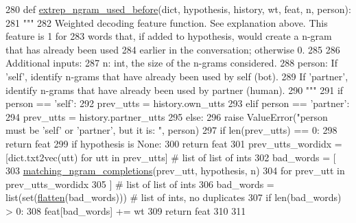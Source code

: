 \begin{DoxyCode}
280 \textcolor{keyword}{def }\hyperlink{namespaceprojects_1_1controllable__dialogue_1_1controllable__seq2seq_1_1controls_a5bc41cc6c701b5da46a74b17ead0e834}{extrep\_ngram\_used\_before}(dict, hypothesis, history, wt, feat, n, person):
281     \textcolor{stringliteral}{"""}
282 \textcolor{stringliteral}{    Weighted decoding feature function. See explanation above. This feature is 1 for}
283 \textcolor{stringliteral}{    words that, if added to hypothesis, would create a n-gram that has already been used}
284 \textcolor{stringliteral}{    earlier in the conversation; otherwise 0.}
285 \textcolor{stringliteral}{}
286 \textcolor{stringliteral}{    Additional inputs:}
287 \textcolor{stringliteral}{      n: int, the size of the n-grams considered.}
288 \textcolor{stringliteral}{      person: If 'self', identify n-grams that have already been used by self (bot).}
289 \textcolor{stringliteral}{        If 'partner', identify n-grams that have already been used by partner (human).}
290 \textcolor{stringliteral}{    """}
291     \textcolor{keywordflow}{if} person == \textcolor{stringliteral}{'self'}:
292         prev\_utts = history.own\_utts
293     \textcolor{keywordflow}{elif} person == \textcolor{stringliteral}{'partner'}:
294         prev\_utts = history.partner\_utts
295     \textcolor{keywordflow}{else}:
296         \textcolor{keywordflow}{raise} ValueError(\textcolor{stringliteral}{"person must be 'self' or 'partner', but it is: "}, person)
297     \textcolor{keywordflow}{if} len(prev\_utts) == 0:
298         \textcolor{keywordflow}{return} feat
299     \textcolor{keywordflow}{if} hypothesis \textcolor{keywordflow}{is} \textcolor{keywordtype}{None}:
300         \textcolor{keywordflow}{return} feat
301     prev\_utts\_wordidx = [dict.txt2vec(utt) \textcolor{keywordflow}{for} utt \textcolor{keywordflow}{in} prev\_utts]  \textcolor{comment}{# list of list of ints}
302     bad\_words = [
303         \hyperlink{namespaceprojects_1_1controllable__dialogue_1_1controllable__seq2seq_1_1controls_ab562827e4a16578079aa8121ebadcda7}{matching\_ngram\_completions}(prev\_utt, hypothesis, n)
304         \textcolor{keywordflow}{for} prev\_utt \textcolor{keywordflow}{in} prev\_utts\_wordidx
305     ]  \textcolor{comment}{# list of list of ints}
306     bad\_words = list(set(\hyperlink{namespaceprojects_1_1controllable__dialogue_1_1controllable__seq2seq_1_1controls_a0db4b9d9584cef90aa2515a75e741774}{flatten}(bad\_words)))  \textcolor{comment}{# list of ints, no duplicates}
307     \textcolor{keywordflow}{if} len(bad\_words) > 0:
308         feat[bad\_words] += wt
309     \textcolor{keywordflow}{return} feat
310 
311 
\end{DoxyCode}
